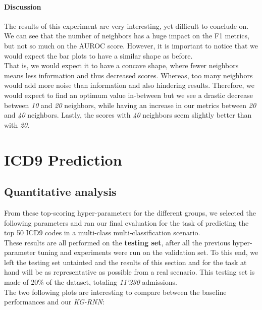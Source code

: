 \paragraph{Discussion} The results of this experiment are very interesting, yet difficult to conclude on. We can see that the number of neighbors has a huge impact on the F1 metrics, but not so much on the AUROC score. However, it is important to notice that we would expect the bar plots to have a similar shape as before. \\

That is, we would expect it to have a concave shape, where fewer neighbors means less information and thus decreased scores. Whereas, too many neighbors would add more noise than information and also hindering results. Therefore, we would expect to find an optimum value in-between but we see a drastic decrease between \textit{10} and \textit{20} neighbors, while having an increase in our metrics between \textit{20} and \textit{40} neighbors. Lastly, the scores with \textit{40} neighbors seem slightly better than with \textit{20}.

\newpage
\section{ICD9 Prediction}
\subsection{Quantitative analysis}
From these top-scoring hyper-parameters for the different groups, we selected the following parameters and ran our final evaluation for the task of predicting the top 50 ICD9 codes in a multi-class multi-classification scenario. \\

These results are all performed on the \textbf{testing set}, after all the previous hyper-parameter tuning and experiments were run on the validation set. To this end, we left the testing set untainted and the results of this section and for the task at hand will be as representative as possible from a real scenario. This testing set is made of 20\% of the dataset, totaling \textit{11'230} admissions. \\

The two following plots are interesting to compare between the baseline performances and our \emph{KG-RNN}:

